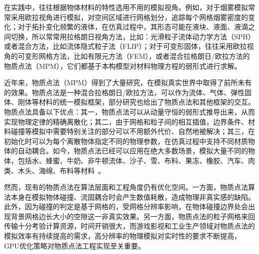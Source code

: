 
在实践中，往往根据物体材料的特性选用不用的模拟视角。例如，对于烟雾模拟常常采用欧拉视角进行模拟，对空间区域进行网格划分，追踪每个网格烟雾密度的变化；对于拓扑变化频繁的液体，在仿真过程中，其形态可能在液块、液面、液滴之间切换，所以常常用拉格朗日视角方法，比如：光滑粒子流体动力学方法（SPH）或者混合方法，比如流体隐式粒子法（FLIP）；对于可变形固体，往往采用欧拉视角的可变形网格方法，比如有限元方法（FEM），或者混合拉格朗日/欧拉方法的物质点法（MPM），它们都基于本构模型对材料物理方程的弱形式进行求解。

近年来，物质点法（MPM）得到了大量研究，在模拟真实世界中取得了前所未有的效果。物质点法是一种混合拉格朗日/欧拉方法，可以作为流体、气体、弹性固体、刚体等材料的统一模拟框架，部分研究也给出了物质点法和其他框架的交互。物质点法具备以下优点：其一，物质点法可以从动量守恒的弱形式推导出来，从而实现物理定律的精确离散化；其二，由于网格和粒子间的相互插值，边界条件、材料碰撞等模拟中需要特别关注的部分可以不用额外代价、自然地被解决；其三，在初始化时可以为每个离散物体指定不同的物理参数，在仿真过程中支持不同材质物体的自动耦合。如今，物质点法已经可以应用在绝大多数场景，模拟大量不同的物体，包括水、蜂蜜、牛奶、非牛顿流体、沙子、雪、布料、果冻、橡胶、汽车、肉类、木头、海绵、布料等材料~\cite{jiang2015affine,jiang2017anisotropic,gao2017adaptive,zhao2020novel,fang2020iq,yu2024xpbi,li2024dynamic}。



然而，现有的物质点法在算法层面和工程角度仍有优化空间。一方面，物质点法算法本身在模拟物体碰撞、流固耦合时会产生数值耗散，造成物理非真实感的缺陷。此外，因为碰撞的判定是基于网格的，受网格分辨率影响，在物体碰撞边界处会出现背景网格边长大小的空隙这一非真实效果。另一方面，物质点法的粒子网格来回传输十分考验计算资源，时间开销很大，而游戏影视和工业生产领域对物质点法的模拟效率有持续提高的需求，高分辨率的物理模拟对实时性的要求不断提高，GPU优化策略对物质点法工程实现至关重要。


